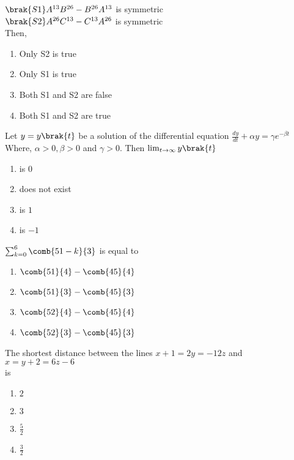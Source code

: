     $\brak{S1}A^{13}B^{26}-B^{26}A^{13}$ is symmetric \\
    $\brak{S2}A^{26}C^{13}-C^{13}A^{26}$ is symmetric\\
    Then, \hfill{}
    \begin{enumerate}
        \item Only S2 is true
        \item Only S1 is true
        \item Both S1 and S2 are false
        \item Both S1 and S2 are true
    \end{enumerate}
    \item Let $y=y\brak{t}$ be a solution of the differential equation $\frac{dy}{dt}+\alpha y=\gamma e^{-\beta t}$\\
    Where, $\alpha >0, \beta >0$ and $\gamma >0$. Then $\lim_{t \to \infty}y\brak{t}$ \hfill{}
    \begin{enumerate}
        \item is $0$
        \item does not exist
        \item is $1$
        \item is $-1$
    \end{enumerate}
    \item $\sum_{k=0}^6 \comb{51-k}{3}$ is equal to \hfill{}
    \begin{enumerate}
        \item $\comb{51}{4}-\comb{45}{4}$
        \item $\comb{51}{3}-\comb{45}{3}$
        \item $\comb{52}{4}-\comb{45}{4}$
        \item $\comb{52}{3}-\comb{45}{3}$
    \end{enumerate}
    \item The shortest distance between the lines $x+1=2y=-12z$ and $x=y+2=6z-6$ \\ is 
\hfill{}
    \begin{enumerate}
        \item $2$
        \item $3$
        \item $\frac{5}{2}$
        \item $\frac{3}{2}$
    \end{enumerate}

